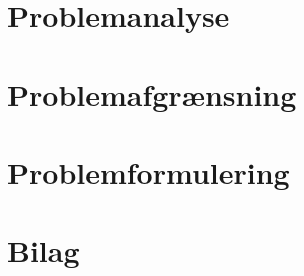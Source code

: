 \documentclass[12pt,hidelinks]{article}
\begin{document}
	\section{Problemanalyse}
	
	
	
	
	
	
	
	
	
	\section{Problemafgrænsning}
    \section{Problemformulering}
    \newpage
    \section{Bilag}
    
    
    
	
	
\end{document}
